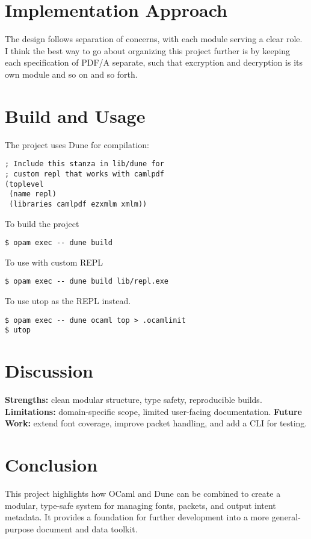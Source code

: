 \documentclass[11pt]{article}
\begin{document}
\section*{Implementation Approach}
The design follows separation of concerns, with each module serving a clear role. 
I think the best way to go about organizing this project further is by keeping each specification of PDF/A separate,
such that excryption and decryption is its own module and so on and so forth. 

\section*{Build and Usage}
The project uses Dune for compilation:
\begin{verbatim}
; Include this stanza in lib/dune for 
; custom repl that works with camlpdf
(toplevel
 (name repl)
 (libraries camlpdf ezxmlm xmlm))
\end{verbatim}
To build the project 
\begin{verbatim}
$ opam exec -- dune build
\end{verbatim}
To use with custom REPL
\begin{verbatim}
$ opam exec -- dune build lib/repl.exe
\end{verbatim}
To use utop as the REPL instead.
\begin{verbatim}
$ opam exec -- dune ocaml top > .ocamlinit
$ utop
\end{verbatim}

\section*{Discussion}
\textbf{Strengths:} clean modular structure, type safety, reproducible builds.  
\textbf{Limitations:} domain-specific scope, limited user-facing documentation.  
\textbf{Future Work:} extend font coverage, improve packet handling, and add a CLI for testing.

\section*{Conclusion}
This project highlights how OCaml and Dune can be combined to create a modular, type-safe system for managing fonts, packets, and output intent metadata. It provides a foundation for further development into a more general-purpose document and data toolkit.
\end{document}
